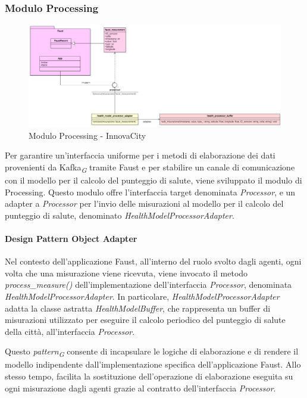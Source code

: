 \subsubsection{Modulo Processing}
\begin{figure}[H]
    \centering
    \includegraphics[width=1\textwidth]{../Images/SpecificaTecnica/processorFaust.PNG}
    \caption{Modulo Processing - InnovaCity}
    \label{fig: processHealth}
\end{figure}
Per garantire un'interfaccia uniforme per i metodi di elaborazione dei dati provenienti da Kafka\textsubscript{\textit{G}} tramite Faust e per stabilire un canale di comunicazione con il modello per il calcolo del punteggio di salute, viene sviluppato il modulo di Processing. Questo modulo offre l'interfaccia target denominata \textit{Processor}, e un adapter a \textit{Processor} per l'invio delle misurazioni al modello per il calcolo del punteggio di salute, denominato \textit{HealthModelProcessorAdapter}.

\paragraph*{Design Pattern Object Adapter}
Nel contesto dell'applicazione Faust, all'interno del ruolo svolto dagli agenti, ogni volta che una misurazione viene ricevuta, viene invocato il metodo \textit{process\_measure()} dell'implementazione dell'interfaccia \textit{Processor}, denominata \textit{HealthModelProcessorAdapter}. In particolare, \textit{HealthModelProcessorAdapter} adatta la classe astratta \textit{HealthModelBuffer}, che rappresenta un buffer di misurazioni utilizzato per eseguire il calcolo periodico del punteggio di salute della città, all'interfaccia \textit{Processor}.

Questo \textit{pattern}\textsubscript{\textit{G}} consente di incapsulare le logiche di elaborazione e di rendere il modello indipendente dall'implementazione specifica dell'applicazione Faust. Allo stesso tempo, facilita la sostituzione dell'operazione di elaborazione eseguita su ogni misurazione dagli agenti grazie al contratto dell'interfaccia \textit{Processor}.
